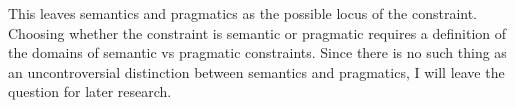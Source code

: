 \documentclass[GPFinal]{subfiles}
\begin{document}
This leaves semantics and pragmatics as the possible locus of the constraint.
Choosing whether the constraint is semantic or pragmatic requires a definition of the domains of semantic vs pragmatic constraints.
Since there is no such thing as an uncontroversial distinction between semantics and pragmatics, I will leave the question for later research.
\end{document}
